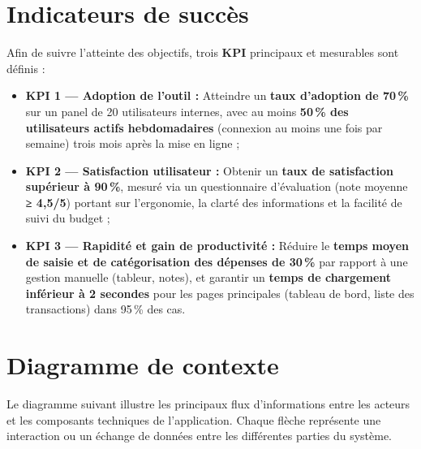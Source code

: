 
\section{Indicateurs de succès}

\begin{tcolorbox}[colback=blue!5!white,colframe=blue!60!black,title=\textbf{Indicateurs de performance (KPI)}]
Afin de suivre l’atteinte des objectifs, trois \textbf{KPI} principaux et mesurables sont définis :

\begin{itemize}
    \item \textbf{KPI 1 — Adoption de l’outil :} 
    Atteindre un \textbf{taux d’adoption de 70\,\%} sur un panel de 20 utilisateurs internes, avec au moins \textbf{50\,\% des utilisateurs actifs hebdomadaires} (connexion au moins une fois par semaine) trois mois après la mise en ligne ;

    \item \textbf{KPI 2 — Satisfaction utilisateur :}
    Obtenir un \textbf{taux de satisfaction supérieur à 90\,\%}, mesuré via un questionnaire d’évaluation (note moyenne \textbf{≥ 4{,}5/5}) portant sur l’ergonomie, la clarté des informations et la facilité de suivi du budget ;

    \item \textbf{KPI 3 — Rapidité et gain de productivité :}
    Réduire le \textbf{temps moyen de saisie et de catégorisation des dépenses de 30\,\%} par rapport à une gestion manuelle (tableur, notes), et garantir un \textbf{temps de chargement inférieur à 2 secondes} pour les pages principales (tableau de bord, liste des transactions) dans 95\,\% des cas.
\end{itemize}
\end{tcolorbox}


\section{Diagramme de contexte}

\begin{tcolorbox}[colback=gray!5!white,colframe=gray!60!black,title=\textbf{Description du diagramme}]
Le diagramme suivant illustre les principaux flux d’informations entre les acteurs et les composants techniques de l’application.  
Chaque flèche représente une interaction ou un échange de données entre les différentes parties du système.
\end{tcolorbox}

